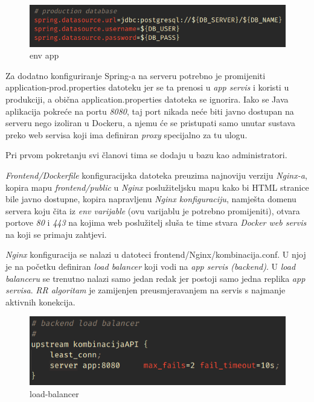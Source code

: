 		\begin{figure}[H]
					\includegraphics[scale=0.8]{figures/5-env.PNG}
					\centering
					\caption{env app}
					\label{fig:env app}
				\end{figure} 
				
		Za dodatno konfiguriranje Spring-a na serveru potrebno je promijeniti application-prod.properties datoteku jer se ta prenosi u  \textit{app servis} i koristi u produkciji, a obična application.properties datoteka se ignorira. 
Iako se Java aplikacija pokreće na portu  \textit{8080}, taj port nikada neće biti javno dostupan na serveru nego izoliran u Dockeru, a njemu će se pristupati samo unutar sustava preko web servisa koji ima definiran  \textit{proxy} specijalno za tu ulogu.

		Pri prvom pokretanju svi članovi tima se dodaju u bazu kao administratori.\\
		
		
		
		 \textit{Frontend/Dockerfile}  konfiguracijska datoteka preuzima najnoviju verziju  \textit{Nginx-a}, kopira mapu  \textit{frontend/public} u  \textit{Nginx} poslužiteljsku mapu kako bi HTML stranice bile javno dostupne, kopira napravljenu  \textit{Nginx konfiguraciju}, namješta domenu servera koju čita iz  \textit{env varijable} (ovu varijablu je potrebno promijeniti), otvara portove  \textit{80} i  \textit{443} na kojima web poslužitelj sluša te time stvara  \textit{Docker web servis} na koji se primaju zahtjevi.

		 \textit{Nginx} konfiguracija se nalazi u datoteci frontend/Nginx/kombinacija.conf. U njoj je na početku definiran  \textit{load balancer} koji vodi na  \textit{app servis (backend)}. U  \textit{load balanceru} se trenutno nalazi samo jedan redak jer postoji samo jedna replika  \textit{app servisa}.  \textit{RR algoritam} je zamijenjen preusmjeravanjem na servis s najmanje aktivnih konekcija.
		
		\begin{figure}[H]
					\includegraphics[scale=0.8]{figures/6-load-balancer.PNG}
					\centering
					\caption{load-balancer}
					\label{fig:load-balancer}
				\end{figure} 
		
